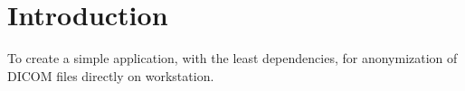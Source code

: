 \documentclass[twocolumn]{bmcart}%
\begin{document}
\begin{frontmatter}
\begin{fmbox}



	








%
\end{fmbox}%

\end{frontmatter}


\section{Introduction}\label{introduction}

To create a simple application, with the least dependencies, for
anonymization of DICOM files directly on workstation.
\end{document}
